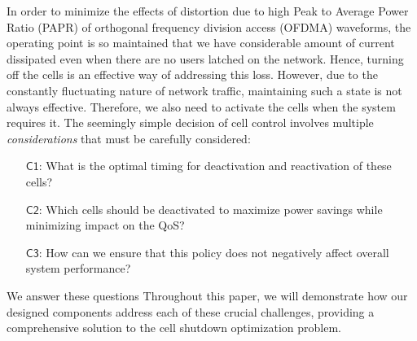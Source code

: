 In order to minimize the effects of distortion due to high Peak to Average Power Ratio (PAPR) of orthogonal frequency division access (OFDMA) waveforms, the operating point is so maintained that we have considerable amount of current dissipated even when there are no users latched on the network. 
Hence, turning off the cells is an effective way of addressing this loss.
However, due to the constantly fluctuating nature of network traffic, maintaining such a state is not always effective. 
Therefore, we also need to activate the cells when the system requires it.
The seemingly simple decision of cell control involves multiple \textit{considerations} that must be carefully considered:
\begin{itemize}
    \item[$\boldsymbol{\mathsf{C1}}$:] What is the optimal timing for deactivation and reactivation of these cells?
    \item[$\boldsymbol{\mathsf{C2}}$:] Which cells should be deactivated to maximize power savings while minimizing impact on the QoS? 
    \item[$\boldsymbol{\mathsf{C3}}$:] How can we ensure that this policy does not negatively affect overall system performance? 
\end{itemize}
\noindent We answer these questions 
Throughout this paper, we will demonstrate how our designed components address each of these crucial challenges, providing a comprehensive solution to the cell shutdown optimization problem.


